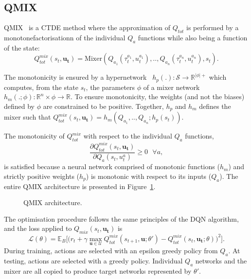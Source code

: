 \subsection{QMIX}
QMIX~\citep{Rashid2018} is a CTDE method where the approximation of $Q_{tot}$ is performed by a monotonefactorisationn of the individual $Q_a$ functions while also being a function of the state:
\begin{equation}
     Q_{tot}^{mix}(s_t, \mathbf{u_t})=\text{Mixer} \left(Q_{a_1}(\tau^{a_1}_t, u_t^{a_1}) ,..,Q_{a_n}(\tau^{a_n}_t, u_t^{a_n}), s_t\right).
     \label{eq:ch3_qmixappendix}
\end{equation}

The monotonicity is ensured by a hypernetwork~\citep{Ha2016HyperNetworks} $h_p(.): \mathcal{S} \rightarrow \mathbb{R}^{|\phi|+}$ which computes, from the state $s_t$, the parameters $\phi$ of a mixer network $h_m(.;\phi):\mathbb{R}^n \times \phi \rightarrow \mathbb{R}$.
To ensure monotonicity, the weights (and not the biases) defined by $\phi$ are constrained to be positive.
Together, $h_p$ and $h_m$ defines the mixer such that $ Q_{tot}^{mix}(s_t, \mathbf{u_t}) = h_m\left(Q_{a_1},..,Q_{a_n}; h_p(s_t)\right)$.

The monotonicity of $Q_{tot}^{mix}$ with respect to the individual $Q_a$ functions, 
\begin{equation}
    \frac{\partial Q_{tot}^{mix}(s_t, \mathbf{u_t})}{\partial Q_{a}(s_t, u_t^{a})} \geq 0 \text{ } \forall a
    \label{eq:ch3_monotonicity},
\end{equation}
is satisfied because a neural network comprised of monotonic functions ($h_m$) and strictly positive weights ($h_p$) is monotonic with respect to its inputs ($Q_a$). 
The entire QMIX architecture is presented in Figure~\ref{fig:qmix}.

\begin{figure}
\centering

\caption{QMIX architecture.}
\label{fig:qmix}
\end{figure}

The optimisation procedure follows the same principles of the DQN algorithm, and the loss applied to $Q_{mix}(s_t, \mathbf{u_t})$ is 
\begin{equation}
    \mathcal{L}(\theta) = \mathbb{E}_{B}
    \bigg[  
    \big(r_{t} + \gamma \max_{\mathbf{u} \in \mathcal{U}} Q_{tot}^{mix}(s_{t+1}, \mathbf{u}; \theta')
    - Q_{tot}^{mix}(s_{t}, \mathbf{u_{t}}; \theta)\big)^{2}
    \bigg].
    \label{eq:QMIX_loss}
\end{equation}
During training, actions are selected with an epsilon greedy policy from $Q_a$.
At testing, actions are selected with a greedy policy.
Individual $Q_a$ networks and the mixer are all copied to produce target networks represented by $\theta'$.

